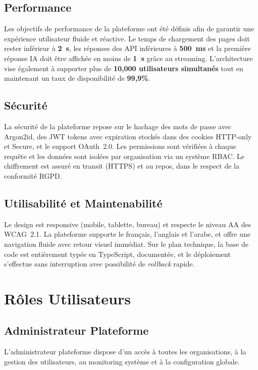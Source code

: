 \documentclass[12pt, a4paper, twoside]{report}
\begin{document}
\subsection{Performance}
Les objectifs de performance de la plateforme ont été définis afin de garantir une expérience utilisateur fluide et réactive. Le temps de chargement des pages doit rester inférieur à \textbf{2~s}, les réponses des API inférieures à \textbf{500~ms} et la première réponse IA doit être affichée en moins de \textbf{1~s} grâce au streaming. L'architecture vise également à supporter plus de \textbf{10,000 utilisateurs simultanés} tout en maintenant un taux de disponibilité de \textbf{99,9\%}.

\subsection{Sécurité}

La sécurité de la plateforme repose sur le hachage des mots de passe avec Argon2id,
des JWT tokens avec expiration stockés dans des cookies HTTP-only et Secure, et le
support OAuth~2.0. Les permissions sont vérifiées à chaque requête et les données
sont isolées par organisation via un système RBAC. Le chiffrement est assuré en
transit (HTTPS) et au repos, dans le respect de la conformité RGPD.

\subsection{Utilisabilité et Maintenabilité}

Le design est responsive (mobile, tablette, bureau) et respecte le niveau AA des
WCAG~2.1. La plateforme supporte le français, l'anglais et l'arabe, et offre une
navigation fluide avec retour visuel immédiat. Sur le plan technique, la base de
code est entièrement typée en TypeScript, documentée, et le déploiement s'effectue
sans interruption avec possibilité de \textit{rollback} rapide.

\section{Rôles Utilisateurs}

\subsection{Administrateur Plateforme}

L'administrateur plateforme dispose d'un accès à toutes les organisations, à la
gestion des utilisateurs, au monitoring système et à la configuration globale.
\end{document}

